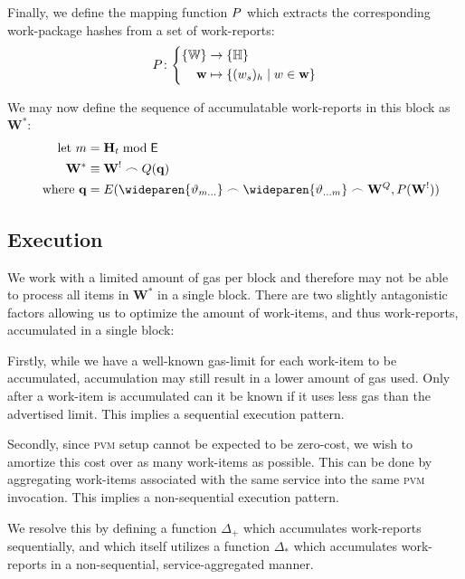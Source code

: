 Finally, we define the mapping function $P$ which extracts the corresponding work-package hashes from a set of work-reports:
\begin{equation}
  \srmap\colon\left\{\begin{aligned}
    \{\mathbb{W}\} &\to \{\H\}\\
    \mathbf{w} &\mapsto \{ (w_s)_h \mid w \in \mathbf{w} \}
  \end{aligned}\right.
\end{equation}

We may now define the sequence of accumulatable work-reports in this block as $\mathbf{W}^*$:
\begin{align}
  \using m &= \mathbf{H}_t \bmod \mathsf{E}\\
  \mathbf{W}^* &\equiv \mathbf{W}^! \frown Q(\mathbf{q}) \\
  \quad\where \mathbf{q} &= E(\wideparen{\ready_{m\dots}} \concat \wideparen{\ready_{\dots m}} \concat \mathbf{W}^Q, \srmap(\mathbf{W}^!))
\end{align}

\subsection{Execution}

We work with a limited amount of gas per block and therefore may not be able to process all items in $\mathbf{W}^*$ in a single block. There are two slightly antagonistic factors allowing us to optimize the amount of work-items, and thus work-reports, accumulated in a single block:

Firstly, while we have a well-known gas-limit for each work-item to be accumulated, accumulation may still result in a lower amount of gas used. Only after a work-item is accumulated can it be known if it uses less gas than the advertised limit. This implies a sequential execution pattern.

Secondly, since \textsc{pvm} setup cannot be expected to be zero-cost, we wish to amortize this cost over as many work-items as possible. This can be done by aggregating work-items associated with the same service into the same \textsc{pvm} invocation. This implies a non-sequential execution pattern.

We resolve this by defining a function $\Delta_+$ which accumulates work-reports sequentially, and which itself utilizes a function $\Delta_*$ which accumulates work-reports in a non-sequential, service-aggregated manner.

